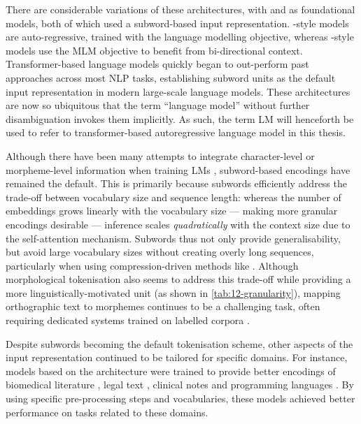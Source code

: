 There are considerable variations of these architectures, with  \citep{radford2018gpt1} and \bert \citep{devlin2019bert} as foundational models, both of which used a subword-based input representation. -style models are auto-regressive, trained with the language modelling objective, whereas \bert-style models use the MLM objective to benefit from bi-directional context. Transformer-based language models quickly began to out-perform past approaches across most NLP tasks, establishing subword units as the default input representation in modern large-scale language models. These architectures are now so ubiquitous that the term ``language model'' without further disambiguation invokes them implicitly. As such, the term LM will henceforth be used to refer to transformer-based autoregressive language model in this thesis.

Although there have been many attempts to integrate character-level or morpheme-level information when training LMs \citep[e.g.][]{ma-etal-2020-charbert, nzeyimana-niyongabo-rubungo-2022-kinyabert}, subword-based encodings have remained the default. This is primarily because subwords efficiently address the trade-off between vocabulary size and sequence length: whereas the number of embeddings grows linearly with the vocabulary size --- making more granular encodings desirable --- inference scales \emph{quadratically} with the context size due to the self-attention mechanism. Subwords thus not only provide generalisability, but avoid large vocabulary sizes without creating overly long sequences, particularly when using compression-driven methods like \bpe. Although morphological tokenisation also seems to address this trade-off while providing a more linguistically-motivated unit (as shown in \cref{tab:12-granularity}), mapping orthographic text to morphemes continues to be a challenging task, often requiring dedicated systems trained on labelled corpora \citep{batsuren-etal-2022-sigmorphon}. 

Despite subwords becoming the default tokenisation scheme, other aspects of the input representation continued to be tailored for specific domains. For instance, models based on the \bert architecture were trained to provide better encodings of biomedical literature \citep[;][]{lee2020biobert}, legal text \citep[;][]{chalkidis2020legal}, clinical notes \citep[;][]{alsentzer2019publicly} and programming languages \citep[;][]{feng-etal-2020-codebert}. By using specific pre-processing steps and vocabularies, these models achieved better performance on tasks related to these domains.

